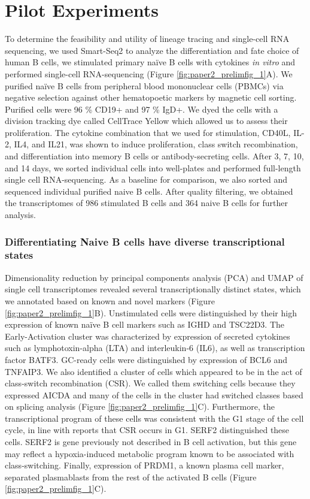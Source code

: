 \section{Pilot Experiments}

To determine the feasibility and utility of lineage tracing and single-cell RNA sequencing, we used Smart-Seq2 to analyze the differentiation and fate choice of human B cells, we stimulated primary naïve B cells with cytokines \textit{in vitro} and performed single-cell RNA-sequencing  (Figure \ref{fig:paper2_prelimfig_1}A). We purified naïve B cells from peripheral blood mononuclear cells (PBMCs) via negative selection against other hematopoetic markers by magnetic cell sorting. Purified cells were 96 \% CD19+ and 97 \% IgD+. We dyed the cells with a division tracking dye called CellTrace Yellow which allowed us to assess their proliferation. The cytokine combination that we used for stimulation, CD40L, IL-2, IL4, and IL21, was shown to induce proliferation, class switch recombination, and differentiation into memory B cells or antibody-secreting cells\cite{konforte_il-21_2009}. After 3, 7, 10, and 14 days, we sorted individual cells into well-plates and performed full-length single cell RNA-sequencing. As a baseline for comparison, we also sorted and sequenced individual purified naive B cells. After quality filtering, we obtained the transcriptomes of 986 stimulated B cells and 364 naive B cells for further analysis.

\subsubsection{Differentiating Naive B cells have diverse transcriptional states}

Dimensionality reduction by principal components analysis (PCA) and UMAP\cite{mcinnes_umap_2018} of single cell transcriptomes revealed several transcriptionally distinct states, which we annotated based on known and novel markers  (Figure \ref{fig:paper2_prelimfig_1}B). Unstimulated cells were distinguished by their high expression of known naïve B cell markers such as IGHD and TSC22D3. The Early-Activation cluster was characterized by expression of secreted cytokines such as lymphotoxin-alpha (LTA) and interleukin-6 (IL6), as well as transcription factor BATF3. GC-ready cells were distinguished by expression of BCL6 and TNFAIP3. We also identified a cluster of cells which appeared to be in the act of class-switch recombination (CSR). We called them switching cells because they expressed AICDA and many of the cells in the cluster had switched classes based on splicing analysis  (Figure \ref{fig:paper2_prelimfig_1}C). Furthermore, the transcriptional program of these cells was consistent with the G1 stage of the cell cycle, in line with reports that CSR occurs in G1\cite{abbott2016germinal}. SERF2 distinguished these cells. SERF2 is gene previously not described in B cell activation, but this gene may reflect a hypoxia-induced metabolic program known to be associated with class-switching\cite{abbott2016germinal}. Finally, expression of PRDM1, a known plasma cell marker, separated plasmablasts from the rest of the activated B cells  (Figure \ref{fig:paper2_prelimfig_1}C).

